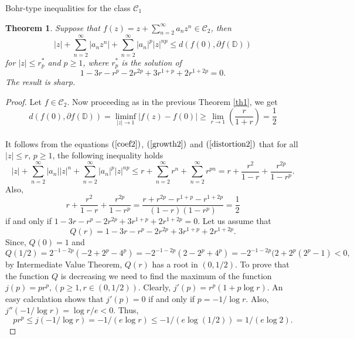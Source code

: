 \documentclass[12pt,a4paper,reqno]{amsart}
\theoremstyle{definition}
\theoremstyle{plain}
\newtheorem{theorem}[definition]{Theorem}
\numberwithin{equation}{section}
\begin{document}
\begin{section}{Bohr-type inequalities for the class $\mathcal{C}_1$}
\begin{theorem}
Suppose that $f(z)=z + \sum_{n=2}^{\infty} a_n z^n \in \mathcal{C}_2$, then
\begin{equation} \label{2.2.2}
|z|+ \sum_{n=2}^{\infty} |a_n z^n| + \sum_{n=2}^{\infty} |a_n|^{p} |z|^{np}  \le d(f(0), \partial{f(\mathbb{D})})
\end{equation}
for $|z| \le r^*_{p}$ and $p \ge 1$, where $r^*_{p}$ is the solution of
\begin{equation*}
1-3 r-r^p-2 r^{2 p}+3 r^{1+p}+2 r^{1+2 p}=0.
\end{equation*}
The result is sharp.
\end{theorem}
\begin{proof} Let $f\in\mathcal{C}_2.$
Now proceeding as  in the previous Theorem \ref{th1}, we get
\begin{equation*}
d(f(0), \partial{f(\mathbb{D})}) = \liminf \limits_{|z| \rightarrow 1} |f(z)-f(0)| \ge \lim \limits_{r \rightarrow 1} \left(\frac{r}{1+r}\right) = \frac{1}{2}
\end{equation*}
\\
\noindent
It follows from the equations $(\ref{coef2})$, $(\ref{growth2})$ and $(\ref{distortion2})$ that for all $|z| \le r$, $p \ge 1$,  the following inequality holds
\begin{equation*}
|z|+ \sum_{n=2}^{\infty} |a_n| |z|^n+ \sum_{n=2}^{\infty} |a_n|^{p} |z|^{np} \le r+ \sum_{n=2}^{\infty} r^{n}+ \sum_{n=2}^{\infty} r^{pn}=r+\frac{r^2}{1-r}+\frac{r^{2 p}}{1-r^p}.
\end{equation*}
Also, \[r+\frac{r^2}{1-r}+\frac{r^{2 p}}{1-r^p}=\frac{r+r^{2 p}-r^{1+p}-r^{1+2 p}}{(1-r) \left(1-r^p\right)}=\frac{1}{2}\]
if and only if $1-3 r-r^p-2 r^{2 p}+3 r^{1+p}+2 r^{1+2 p}=0$.
Let us assume that
\begin{equation*}
Q(r)=1-3 r-r^p-2 r^{2 p}+3 r^{1+p}+2 r^{1+2 p}.
\end{equation*}
Since, $Q(0)=1$ and
\noindent
\[Q(1/2)=2^{-1 - 2 p} (-2 + 2^p - 4^p)=-2^{-1 - 2 p} (2 - 2^p + 4^p)=-2^{-1 - 2 p} (2 + 2^p( 2^p-1)<0,\] by Intermediate Value Theorem, $Q(r)$ has a root in $(0, 1/2)$. To prove that the function $Q$ is decreasing  we need to find the maximum of the function
$j(p)=pr^p, (p\geq 1, r\in(0, 1/2))$. Clearly,
$j'(p)=r^p (1+p \log r).$ An easy calculation shows that  $j'(p)=0 $ if and only if $p= -{1}/{\log r}$. Also, $j''\left(-{1}/{\log r}\right)={\log r}/{e}<0$. Thus,
\begin{equation}\label{eq12}
pr^p\leq j(-{1}/{\log r})=-{1}/{(e \log r)}\leq -{1}/{(e \log (1/2))}={1}/{(e \log 2)}.\end{equation}

\end{proof}
\end{section}
\end{document}
